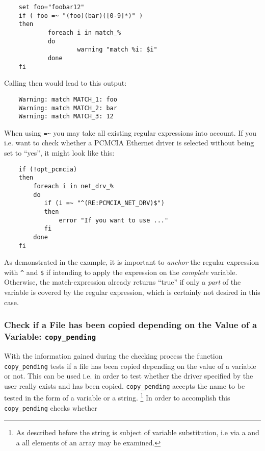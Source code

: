 \begin{example}
\begin{verbatim}
    set foo="foobar12"
    if ( foo =~ "(foo)(bar)([0-9]*)" )
    then
            foreach i in match_%
            do
                    warning "match %i: $i"
            done
    fi
\end{verbatim}
\end{example}

Calling  then would lead to this output:

\begin{example}
\begin{verbatim}
    Warning: match MATCH_1: foo
    Warning: match MATCH_2: bar
    Warning: match MATCH_3: 12
\end{verbatim}
\end{example}

When using \verb?=~? you may take all existing regular expressions
into account. If you i.e. want to check whether a PCMCIA Ethernet driver
is selected without  being set to ``yes'', it might
look like this:

\begin{example}
\begin{verbatim}
    if (!opt_pcmcia)
    then
        foreach i in net_drv_%
        do
           if (i =~ "^(RE:PCMCIA_NET_DRV)$")
           then
               error "If you want to use ..."
           fi
        done
    fi
\end{verbatim}
\end{example}

As demonstrated in the example, it is important to \emph{anchor} the regular
expression with \texttt{\^} and \texttt{\$} if intending to apply the
expression on the \emph{complete} variable. Otherwise, the match-expression
already returns ``true'' if only a \emph{part} of the variable is covered by
the regular expression, which is certainly not desired in this case.

\subsubsection{Check if a File has been copied depending on the Value of a Variable: \texttt{copy\_pending}}

        With the information gained during the checking process the function \texttt{copy\_pending}
        tests if a file has been copied depending on the value of a variable or not.
        This can be used i.e. in order to test whether the driver specified by the user
        really exists and has been copied. \texttt{copy\_pending} accepts the name to be
        tested in the form of a variable or a string. \footnote{As described before
        the string is subject of variable substitution, i.e via a
         and a
        all elements of an array may be examined.} In order to accomplish this \texttt{copy\_pending}
        checks whether

